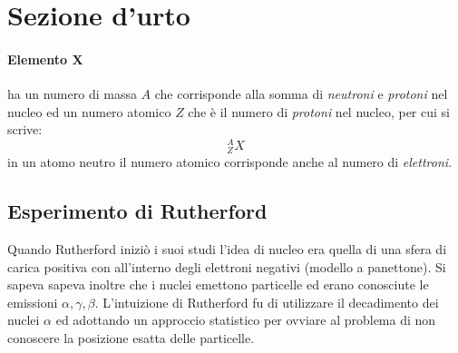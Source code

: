 
\section{Sezione d'urto}

\paragraph{Elemento X} ha un numero di massa $A$ che corrisponde alla somma di \emph{neutroni} e \emph{protoni} nel nucleo ed un numero atomico $Z$ che è il numero di \emph{protoni} nel nucleo, per cui si scrive:
$$^{A}_{Z} X$$
in un atomo neutro il numero atomico corrisponde anche al numero di \emph{elettroni}.


\subsection{Esperimento di Rutherford}
Quando Rutherford iniziò i suoi studi l'idea di nucleo era quella di una sfera di carica positiva con all'interno degli elettroni negativi (modello a panettone).
Si sapeva sapeva inoltre che i nuclei emettono particelle ed erano conosciute le emissioni $\alpha,\gamma ,\beta$.
L'intuizione di Rutherford fu di utilizzare il decadimento dei nuclei $\alpha$ ed adottando un approccio statistico per ovviare al problema di non conoscere la posizione esatta delle particelle.

